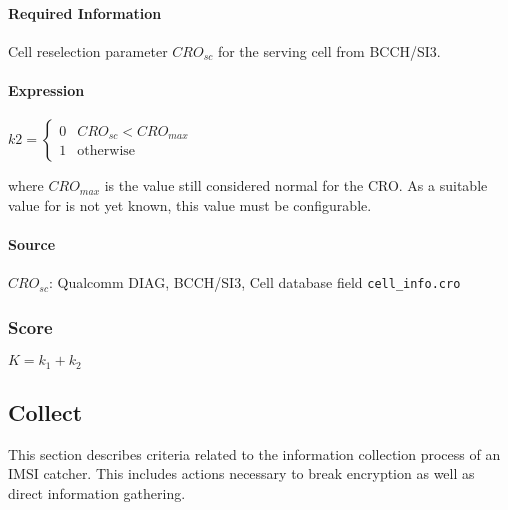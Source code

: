 \documentclass[a4paper,11pt,notitlepage,bigheadings,oneside]{scrartcl}
\begin{document}
\paragraph{Required Information}

Cell reselection parameter $CRO_{sc}$ for the serving cell from BCCH/SI3.

\paragraph{Expression}

$k2 =
\begin{cases}
	0 & CRO_{sc} < CRO_{max}\\
	1 & \text{otherwise}
\end{cases}$

where $CRO_{max}$ is the value still considered normal for the CRO. As a
suitable value for is not yet known, this value must be configurable.

\paragraph{Source}

$CRO_{sc}$: Qualcomm DIAG, BCCH/SI3, Cell database field \verb|cell_info.cro|



\subsubsection{Score}

$K = k_1 + k_2$

\subsection{Collect}

This section describes criteria related to the information collection process
of an IMSI catcher. This includes actions necessary to break encryption as well
as direct information gathering.

\subsubsection{}
\end{document}
